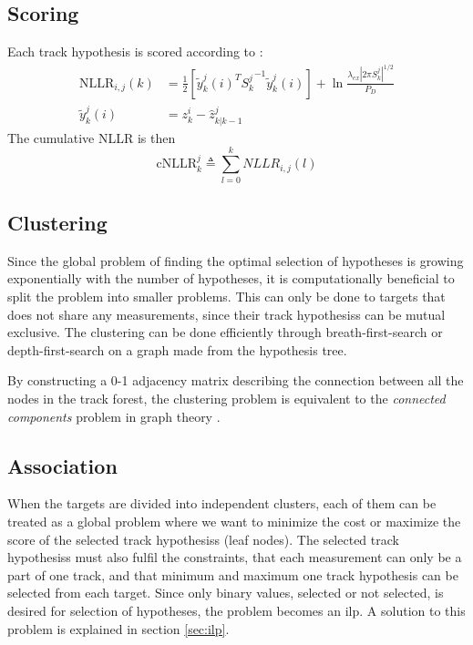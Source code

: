 \subsection{Scoring}
Each \gls{track hypothesis} is scored according to \cite{Bar-Shalom2007}:
\begin{equation}
\begin{split}
\mathrm{NLLR}_{i,j}(k) &= \frac{1}{2} \left[ {\tilde{y}_k^j}(i)^T {S_k^j}^{-1} {\tilde{y}_k^j}(i) \right] + \ln \frac{\lambda_{ex} |2 \pi S_k^j|^{1/2}}{P_D} \\				
\tilde{y}_k^j(i) &= z_k^i -\hat{z}_{k|k-1}^j
\end{split}
\end{equation}
The cumulative NLLR is then
\begin{equation}
\mathrm{cNLLR}_k^j \triangleq \sum_{l=0}^k NLLR_{i,j}(l)
\end{equation}

\subsection{Clustering}
Since the global problem of finding the optimal selection of hypotheses is growing exponentially with the number of hypotheses, it is computationally beneficial to split the problem into smaller problems. This can only be done to targets that does not share any measurements, since their \glspl{track hypothesis} can be mutual exclusive. The clustering can be done efficiently through breath-first-search or depth-first-search on a graph made from the hypothesis tree.

By constructing a 0-1 adjacency matrix describing the connection between all the nodes in the track forest, the clustering problem is equivalent to the \emph{connected components} problem in graph theory \cite{Chen2015}.

\subsection{Association}
When the targets are divided into independent clusters, each of them can be treated as a global problem where we want to minimize the cost or maximize the score of the selected \glspl{track hypothesis} (leaf nodes). The selected \glspl{track hypothesis} must also fulfil the constraints, that each measurement can only be a part of one track, and that minimum and maximum one track hypothesis can be selected from each target. Since only binary values, selected or not selected, is desired for selection of hypotheses, the problem becomes an \gls{ilp}. A solution to this problem is explained in section \ref{sec:ilp}.

